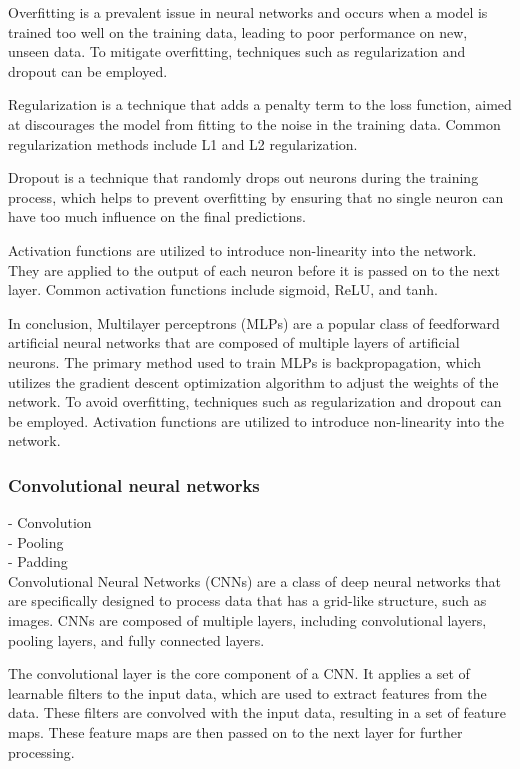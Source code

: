 Overfitting is a prevalent issue in neural networks and occurs when a model is trained too well on the training data, leading to poor performance on new, unseen data. To mitigate overfitting, techniques such as regularization and dropout can be employed.

Regularization is a technique that adds a penalty term to the loss function, aimed at discourages the model from fitting to the noise in the training data. Common regularization methods include L1 and L2 regularization.

Dropout is a technique that randomly drops out neurons during the training process, which helps to prevent overfitting by ensuring that no single neuron can have too much influence on the final predictions.

Activation functions are utilized to introduce non-linearity into the network. They are applied to the output of each neuron before it is passed on to the next layer. Common activation functions include sigmoid, ReLU, and tanh.

In conclusion, Multilayer perceptrons (MLPs) are a popular class of feedforward artificial neural networks that are composed of multiple layers of artificial neurons. The primary method used to train MLPs is backpropagation, which utilizes the gradient descent optimization algorithm to adjust the weights of the network. To avoid overfitting, techniques such as regularization and dropout can be employed. Activation functions are utilized to introduce non-linearity into the network.



\subsubsection{Convolutional neural networks}
- Convolution\\
- Pooling\\
- Padding\\

Convolutional Neural Networks (CNNs) are a class of deep neural networks that are specifically designed to process data that has a grid-like structure, such as images. CNNs are composed of multiple layers, including convolutional layers, pooling layers, and fully connected layers.

The convolutional layer is the core component of a CNN. It applies a set of learnable filters to the input data, which are used to extract features from the data. These filters are convolved with the input data, resulting in a set of feature maps. These feature maps are then passed on to the next layer for further processing.

